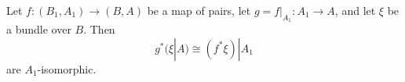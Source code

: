 Let $f: (B_1, A_1) \to (B, A)$ be a map of pairs, let $g = f|_{A_1}: A_1 \to A$, and let $\xi$ be a bundle over $B$. Then
$$g^*(\xi|A) \cong (f^*\xi)|A_1$$
are $A_1$-isomorphic.
